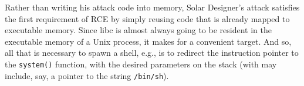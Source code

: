 Rather than writing his attack code into memory, Solar Designer's
attack satisfies the first requirement of RCE by simply reusing code
that is already mapped to executable memory. Since libc is almost
always going to be resident in the executable memory of a Unix
process, it makes for a convenient target. And so, all that is
necessary to spawn a shell, e.g., is to redirect the instruction
pointer to the \texttt{system()} function, with the desired parameters
on the stack (with may include, say, a pointer to the string
\texttt{/bin/sh}).





